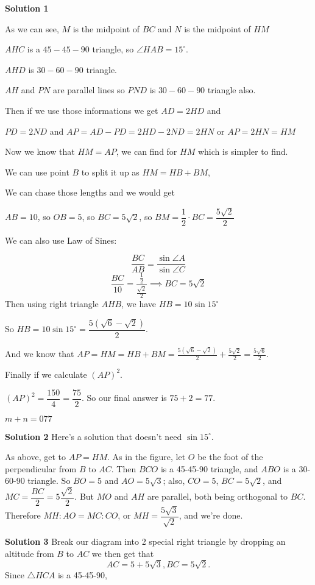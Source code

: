 \documentclass[a4paper,11pt]{article}
\begin{document}
\textbf{Solution 1}

As we can see,
$M$ is the midpoint of $BC$ and $N$ is the midpoint of $HM$


$AHC$ is a $45-45-90$ triangle, so $\angle{HAB}=15^\circ$.


$AHD$ is $30-60-90$ triangle.


$AH$ and $PN$ are parallel lines so $PND$ is $30-60-90$ triangle also.


Then if we use those informations we get $AD=2HD$ and


$PD=2ND$ and $AP=AD-PD=2HD-2ND=2HN$ or $AP=2HN=HM$


Now we know that $HM=AP$, we can find for $HM$ which is simpler to find.


We can use point $B$ to split it up as $HM=HB+BM$,


We can chase those lengths and we would get


$AB=10$, so $OB=5$, so $BC=5\sqrt{2}$, so $BM=\dfrac{1}{2} \cdot BC=\dfrac{5\sqrt{2}}{2}$


We can also use Law of Sines:

\[\frac{BC}{AB}=\frac{\sin\angle A}{\sin\angle C}\]\[\frac{BC}{10}=\frac{\frac{1}{2}}{\frac{\sqrt{2}}{2}}\implies BC=5\sqrt{2}\]
Then using right triangle $AHB$, we have $HB=10 \sin 15^\circ$


So $HB=10 \sin 15^\circ=\dfrac{5(\sqrt{6}-\sqrt{2})}{2}$.


And we know that $AP = HM = HB + BM = \frac{5(\sqrt6-\sqrt2)}{2} + \frac{5\sqrt2}{2} = \frac{5\sqrt6}{2}$.


Finally if we calculate $(AP)^2$.


$(AP)^2=\dfrac{150}{4}=\dfrac{75}{2}$. So our final answer is $75+2=77$.


$m+n=\boxed{077}$

\textbf{Solution 2}
Here's a solution that doesn't need $\sin 15^\circ$.

As above, get to $AP=HM$. As in the figure, let $O$ be the foot of the perpendicular from $B$ to $AC$. Then $BCO$ is a 45-45-90 triangle, and $ABO$ is a 30-60-90 triangle. So $BO=5$ and $AO=5\sqrt{3}$; also, $CO=5$, $BC=5\sqrt2$, and $MC=\dfrac{BC}{2}=5\dfrac{\sqrt2}{2}$. But $MO$ and $AH$ are parallel, both being orthogonal to $BC$. Therefore $MH:AO=MC:CO$, or $MH=\dfrac{5\sqrt3}{\sqrt2}$, and we're done.

\textbf{Solution 3}
Break our diagram into 2 special right triangle by dropping an altitude from $B$ to $AC$ we then get that \[AC=5+5\sqrt{3}, BC=5\sqrt{2}.\] Since $\triangle{HCA}$ is a 45-45-90,
\end{document}
